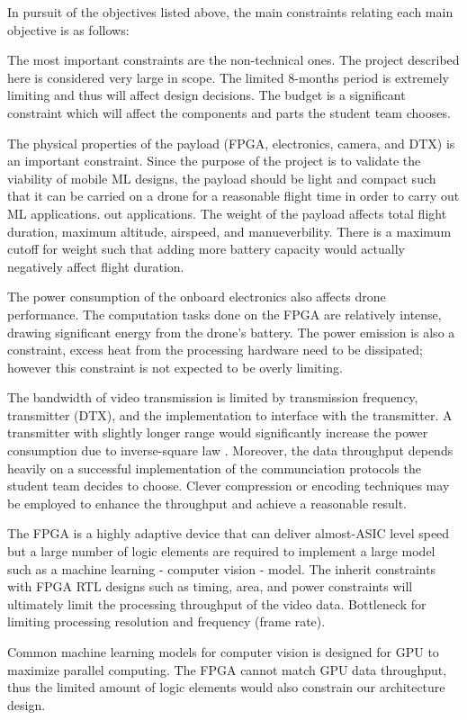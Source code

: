 In pursuit of the objectives listed above, the main constraints relating 
each main objective is as follows:

The most important constraints are the non-technical ones. The project described
here is considered very large in scope. The limited 8-months period is extremely
limiting and thus will affect design decisions. The budget is a significant
constraint which will affect the components and parts the student team chooses.

The physical properties of the payload (FPGA, electronics, camera, and  DTX) is an important constraint. Since the purpose of the project
is to validate the viability of mobile ML designs, the payload should be light and compact such
that it can be carried on a drone for a reasonable flight time in order to carry out ML applications.
out applications. The weight of the payload affects total flight duration, maximum altitude, airspeed, and manueverbility. 
There is a maximum cutoff for weight such that adding more battery capacity would actually negatively affect flight duration.

The power consumption of the onboard electronics also affects drone performance.
The computation tasks done on the FPGA are relatively intense, drawing significant energy from the drone's battery. 
The power emission is also a constraint, excess heat from the processing
hardware need to be dissipated; however this constraint is not expected to be overly limiting.

The bandwidth of video transmission is limited by transmission frequency, transmitter (DTX), and
the implementation to interface with the transmitter. A transmitter with slightly longer range would
significantly increase the power consumption due to inverse-square law \cite{wiki-inverse-square}.
Moreover, the data throughput depends heavily on a successful implementation of the communciation
protocols the student team decides to choose. Clever compression or encoding techniques may be
employed to enhance the throughput and achieve a reasonable result.

The FPGA is a highly adaptive device that can deliver almost-ASIC level speed
but a large number of logic elements are required to implement a large model 
such as a machine learning - computer vision - model. The inherit constraints
with FPGA RTL designs such as timing, area, and power constraints will ultimately
limit the processing throughput of the video data. Bottleneck for limiting
processing resolution and frequency (frame rate).

Common machine learning models for computer vision is designed for GPU to
maximize parallel computing. The FPGA cannot match GPU data throughput, thus
the limited amount of logic elements would also constrain our architecture
design.

